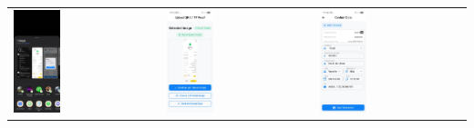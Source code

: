 \begin{tabular}{lll}
    \includegraphics[width=0.33\textwidth]{images/UI/sharing-intent.jpg} &
    \includegraphics[width=0.33\textwidth]{images/UI/shared-confirm.jpg} &
    \includegraphics[width=0.33\textwidth]{images/UI/mock-data.jpg}
    \\
\end{tabular}